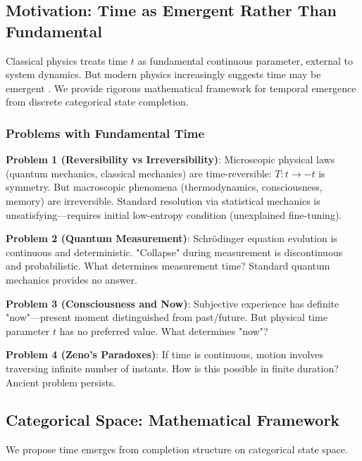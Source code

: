 \documentclass[11pt,onecolumn]{article}
\begin{document}
\subsection{Motivation: Time as Emergent Rather Than Fundamental}

Classical physics treats time $t$ as fundamental continuous parameter, external to system dynamics. But modern physics increasingly suggests time may be emergent \citep{barbour1999end,rovelli2018order}. We provide rigorous mathematical framework for temporal emergence from discrete categorical state completion.

\subsubsection{Problems with Fundamental Time}

\textbf{Problem 1 (Reversibility vs Irreversibility)}: Microscopic physical laws (quantum mechanics, classical mechanics) are time-reversible: $T: t \to -t$ is symmetry. But macroscopic phenomena (thermodynamics, consciousness, memory) are irreversible. Standard resolution via statistical mechanics is unsatisfying---requires initial low-entropy condition (unexplained fine-tuning).

\textbf{Problem 2 (Quantum Measurement)}: Schr\"odinger equation evolution is continuous and deterministic. "Collapse" during measurement is discontinuous and probabilistic. What determines measurement time? Standard quantum mechanics provides no answer.

\textbf{Problem 3 (Consciousness and Now)}: Subjective experience has definite "now"---present moment distinguished from past/future. But physical time parameter $t$ has no preferred value. What determines "now"?

\textbf{Problem 4 (Zeno's Paradoxes)}: If time is continuous, motion involves traversing infinite number of instants. How is this possible in finite duration? Ancient problem persists.

\subsection{Categorical Space: Mathematical Framework}

We propose time emerges from completion structure on categorical state space.
\end{document}
